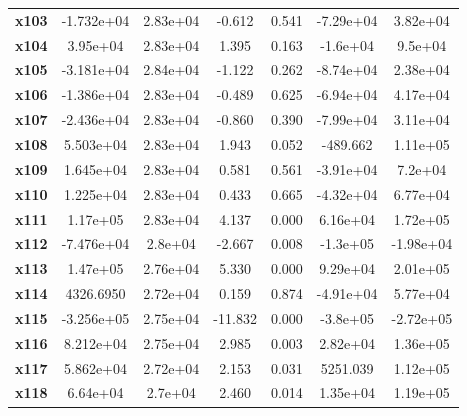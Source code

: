 \documentclass{article}
\begin{document}
\begin{center}
{\begin{tabular}{lcccccc}
\textbf{x103}  &   -1.732e+04  &     2.83e+04     &    -0.612  &         0.541        &    -7.29e+04    &     3.82e+04     \\
\textbf{x104}  &     3.95e+04  &     2.83e+04     &     1.395  &         0.163        &     -1.6e+04    &      9.5e+04     \\
\textbf{x105}  &   -3.181e+04  &     2.84e+04     &    -1.122  &         0.262        &    -8.74e+04    &     2.38e+04     \\
\textbf{x106}  &   -1.386e+04  &     2.83e+04     &    -0.489  &         0.625        &    -6.94e+04    &     4.17e+04     \\
\textbf{x107}  &   -2.436e+04  &     2.83e+04     &    -0.860  &         0.390        &    -7.99e+04    &     3.11e+04     \\
\textbf{x108}  &    5.503e+04  &     2.83e+04     &     1.943  &         0.052        &     -489.662    &     1.11e+05     \\
\textbf{x109}  &    1.645e+04  &     2.83e+04     &     0.581  &         0.561        &    -3.91e+04    &      7.2e+04     \\
\textbf{x110}  &    1.225e+04  &     2.83e+04     &     0.433  &         0.665        &    -4.32e+04    &     6.77e+04     \\
\textbf{x111}  &     1.17e+05  &     2.83e+04     &     4.137  &         0.000        &     6.16e+04    &     1.72e+05     \\
\textbf{x112}  &   -7.476e+04  &      2.8e+04     &    -2.667  &         0.008        &     -1.3e+05    &    -1.98e+04     \\
\textbf{x113}  &     1.47e+05  &     2.76e+04     &     5.330  &         0.000        &     9.29e+04    &     2.01e+05     \\
\textbf{x114}  &    4326.6950  &     2.72e+04     &     0.159  &         0.874        &    -4.91e+04    &     5.77e+04     \\
\textbf{x115}  &   -3.256e+05  &     2.75e+04     &   -11.832  &         0.000        &     -3.8e+05    &    -2.72e+05     \\
\textbf{x116}  &    8.212e+04  &     2.75e+04     &     2.985  &         0.003        &     2.82e+04    &     1.36e+05     \\
\textbf{x117}  &    5.862e+04  &     2.72e+04     &     2.153  &         0.031        &     5251.039    &     1.12e+05     \\
\textbf{x118}  &     6.64e+04  &      2.7e+04     &     2.460  &         0.014        &     1.35e+04    &     1.19e+05     \\

\end{tabular}}
\end{center}
\end{document}
